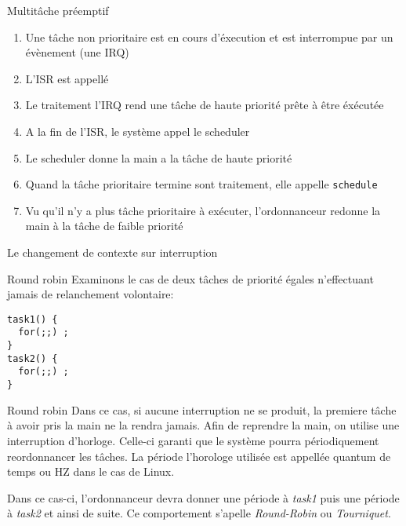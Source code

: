 \begin{frame}{Multitâche préemptif}
  \begin{enumerate} 
  \item  Une tâche  non prioritaire  est en  cours d'éxecution  et est
    interrompue par un évènement (une IRQ)
  \item L'ISR est appellé
  \item Le traitement  l'IRQ rend une tâche de  haute priorité prête à
    être éxécutée
  \item A la fin de l'ISR, le système appel le scheduler
  \item Le scheduler donne la main a la tâche de haute priorité
  \item  Quand  la tâche  prioritaire  termine  sont traitement,  elle
    appelle \texttt{schedule}
  \item   Vu  qu'il  n'y   a  plus   tâche  prioritaire   à  exécuter,
    l'ordonnanceur redonne la main à la tâche de faible priorité
  \end{enumerate} 
\end{frame} 

\begin{frame}{Le changement de contexte sur interruption}
  \begin{center}
  \end{center}
\end{frame} 

\begin{frame}[fragile]{Round robin}
  Examinons  le cas de  deux tâches  de priorité  égales n'effectuant
  jamais de relanchement volontaire:
  \begin{lstlisting} 
task1() {
  for(;;) ;
}
task2() {
  for(;;) ;
}
  \end{lstlisting} 
\end{frame} 

\begin{frame}[fragile]{Round robin}
  Dans ce cas, si aucune interruption ne se produit, la premiere tâche
  à avoir pris la main ne la rendra jamais. Afin de reprendre la main,
  on  utilise une  interruption  d'horloge.  Celle-ci  garanti que  le
  système  pourra périodiquement  reordonnancer les  tâches.  La période
  l'horologe utilisée est appellée quantum de temps ou HZ dans le cas de
  Linux.

  Dans   ce  cas-ci,   l'ordonnanceur  devra   donner  une   période  à
  \emph{task1} puis une période à  \emph{task2} et ainsi de suite.  Ce
  comportement s'apelle \emph{Round-Robin} ou \emph{Tourniquet}.
  \begin{center}
    
  \end{center}
\end{frame}

